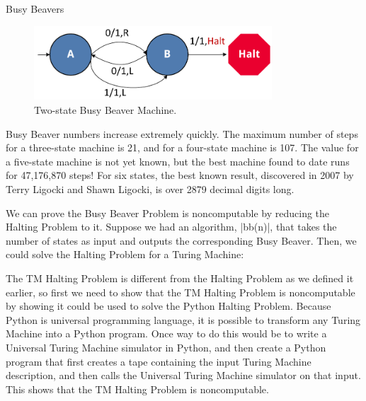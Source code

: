 \begin{schemeregion}
\begin{exploration}{Busy Beavers}
\begin{figure}[!bh]
\begin{center}
\includegraphics[width=3.5in]{figures/tm-bb.pdf}
\caption{Two-state Busy Beaver Machine.}\label{fig:bb}
\end{center}
\end{figure}

Busy Beaver numbers increase extremely quickly.  The maximum number of steps for a three-state machine is 21, and for a four-state machine is 107.  The value for a five-state machine is not yet known, but the best machine found to date runs for 47,176,870 steps!  For six states, the best known result, discovered in 2007 by Terry Ligocki and Shawn Ligocki, is over 2879 decimal digits long.

We can prove the Busy Beaver Problem is noncomputable by reducing the Halting Problem to it.  Suppose we had an algorithm, \pycode|bb(n)|, that takes the number of states as input and outputs the corresponding Busy Beaver.  Then, we could solve the Halting Problem for a Turing Machine:


The TM Halting Problem is different from the Halting Problem as we defined it earlier, so first we need to show that the TM Halting Problem is noncomputable by showing it could be used to solve the Python Halting Problem.  Because Python is universal programming language, it is possible to transform any Turing Machine into a Python program.  Once way to do this would be to write a Universal Turing Machine simulator in Python, and then create a Python program that first creates a tape containing the input Turing Machine description, and then calls the Universal Turing Machine simulator on that input.  This shows that the TM Halting Problem is noncomputable.


\end{exploration}
\end{schemeregion}
